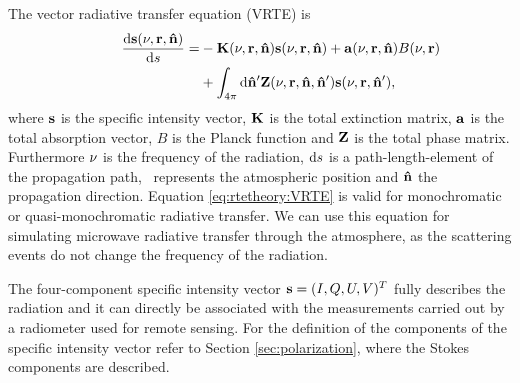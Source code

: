 The vector radiative transfer equation (VRTE) is
 \begin{eqnarray}
  \label{eq:rtetheory:VRTE}
  \frac {\DiffD\StoVec(\Frq,\PPos,\PDir)}{\DiffD s} =
    &{}-\ExtMat(\Frq,\PPos,\PDir) \StoVec(\Frq,\PPos,\PDir) +
    \AbsVec(\Frq,\PPos,\PDir) \rlap{$B(\Frq,\PPos)$} \\ \nonumber
    &{}+ \int_{4\pi} \DiffD\PDir' \PhaMat(\Frq,\PPos,\PDir,\PDir')
    \StoVec(\Frq,\PPos,\PDir'),
\end{eqnarray}
where ${\bf s}$ is the specific intensity vector, ${\bf K}$ is the total
extinction matrix, ${\bf a}$ is the total absorption vector, $B$ is the Planck
function and ${\bf Z}$ is the total phase matrix. Furthermore $\nu$ is the
frequency of the radiation, $\mathrm{d} s$ is a
path-length-element of the propagation path, \PPos\ represents the atmospheric
position and ${\bf \hat{n}}$ the propagation direction. Equation
\ref{eq:rtetheory:VRTE} is valid for monochromatic or quasi-monochromatic
radiative transfer. We can use this equation for simulating microwave radiative
transfer through the atmosphere, as the scattering events do not change the
frequency of the radiation.

The four-component specific intensity vector ${\bf s} = (I,Q,U,V)^T$
fully describes the radiation and it can directly be associated with
the measurements carried out by a radiometer used for remote sensing.
For the definition of the components of the specific intensity vector
refer to Section \ref{sec:polarization}, where the Stokes
components are described. 

